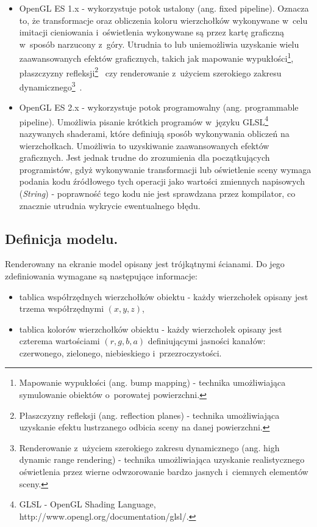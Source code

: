 \documentclass[a4paper,twocolumn,11pt]{article}
\begin{document}
\begin{itemize}
 \item OpenGL ES 1.x - wykorzystuje potok ustalony (ang. fixed pipeline).
  Oznacza to, że transformacje oraz obliczenia koloru wierzchołków wykonywane w~celu imitacji cieniowania i~oświetlenia wykonywane są przez kartę graficzną w~sposób narzucony z~góry.
  Utrudnia to lub uniemożliwia uzyskanie wielu zaawansowanych efektów graficznych, takich jak mapowanie wypukłości\footnote{Mapowanie wypukłości (ang. bump mapping) - technika umożliwiająca symulowanie obiektów o~porowatej powierzchni.}, płaszczyzny refleksji\footnote{Płaszczyzny refleksji (ang. reflection planes) - technika umożliwiająca uzyskanie efektu lustrzanego odbicia sceny na danej powierzchni.}~\cite{tec:3d} czy renderowanie z~użyciem szerokiego zakresu dynamicznego\footnote{Renderowanie z~użyciem szerokiego zakresu dynamicznego (ang. high dynamic range rendering) - technika umożliwiająca uzyskanie realistycznego oświetlenia przez wierne odwzorowanie bardzo jasnych i~ciemnych elementów sceny.}~\cite{nvi:hdr}. 
 \item OpenGL ES 2.x - wykorzystuje potok programowalny (ang. programmable pipeline).
  Umożliwia pisanie krótkich programów w~języku GLSL\footnote{GLSL - OpenGL Shading Language, http://www.opengl.org/documentation/glsl/.} nazywanych shaderami, które definiują sposób wykonywania obliczeń na wierzchołkach.
  Umożliwia to uzyskiwanie zaawansowanych efektów graficznych. Jest jednak trudne do zrozumienia dla początkujących programistów, gdyż wykonywanie transformacji lub oświetlenie sceny wymaga podania kodu źródłowego tych operacji jako wartości zmiennych napisowych (\emph{String}) - poprawność tego kodu nie jest sprawdzana przez kompilator, co znacznie utrudnia wykrycie ewentualnego błędu.
\end{itemize}


\subsection{Definicja modelu.}
 Renderowany na ekranie model opisany jest trójkątnymi ścianami.
 Do jego zdefiniowania wymagane są następujące informacje:

 \begin{itemize}
  \item tablica współrzędnych wierzchołków obiektu - każdy wierzchołek opisany jest trzema współrzędnymi $(x, y, z)$,
  \item tablica kolorów wierzchołków obiektu - każdy wierzchołek opisany jest czterema wartościami $(r, g, b, a)$ definiującymi jasności kanałów: czerwonego, zielonego, niebieskiego i~przezroczystości.
 \end{itemize}
\end{document}
